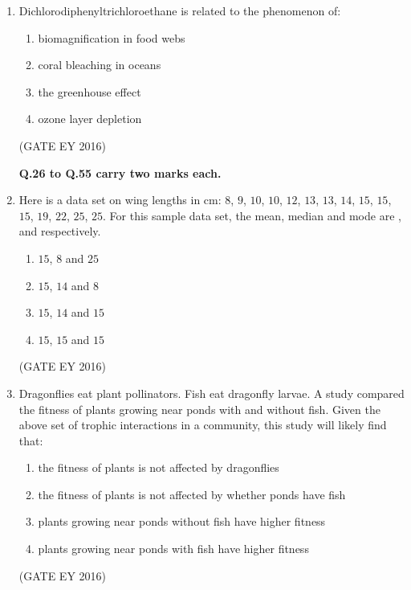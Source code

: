 \documentclass[journal]{IEEEtran}
\begin{document}
\begin{enumerate}[label=Q.\arabic*.]
\item Dichlorodiphenyltrichloroethane is related to the phenomenon of:
\begin{enumerate}
    \item biomagnification in food webs
    \item coral bleaching in oceans
    \item the greenhouse effect
    \item ozone layer depletion
\end{enumerate}
\hfill{(GATE EY 2016)}

\textbf{Q.26 to Q.55 carry two marks each.}

\item Here is a data set on wing lengths in cm: $8$, $9$, $10$, $10$, $12$, $13$, $13$, $14$, $15$, $15$, $15$, $19$, $22$, $25$, $25$. For this sample data set, the mean, median and mode are \underline{\hspace{3cm}}, \underline{\hspace{3cm}} and \underline{\hspace{3cm}} respectively.
\begin{multicols}{4}
\begin{enumerate}
    \item $15$, $8$ and $25$
    \item $15$, $14$ and $8$
    \item $15$, $14$ and $15$
    \item $15$, $15$ and $15$
\end{enumerate}
\end{multicols}
\hfill{(GATE EY 2016)}

\item Dragonflies eat plant pollinators. Fish eat dragonfly larvae. A study compared the fitness of plants growing near ponds with and without fish. Given the above set of trophic interactions in a community, this study will likely find that:
\begin{enumerate}
    \item the fitness of plants is not affected by dragonflies
    \item the fitness of plants is not affected by whether ponds have fish
    \item plants growing near ponds without fish have higher fitness
    \item plants growing near ponds with fish have higher fitness
\end{enumerate}
\hfill{(GATE EY 2016)}


\end{enumerate}
\end{document}
